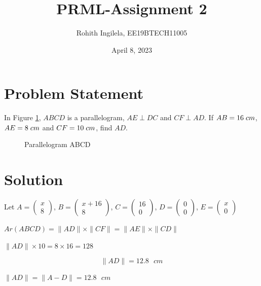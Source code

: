 \documentclass[letterpaper,12pt]{article}
\title{PRML-Assignment 2}
\author{Rohith Ingilela,  EE19BTECH11005 }
\date{April 8, 2023}
\begin{document}
\maketitle

\section{Problem Statement}

In Figure \ref{fig:fig1}, $ABCD$ is a parallelogram, $AE \perp DC$
and $CF \perp AD$. If $AB = 16 \hspace{0.1cm} cm$, $AE = 8 \hspace{0.1cm} cm$ and
$CF = 10 \hspace{0.1cm} cm$, find $AD$.

\begin{figure}[!ht]
\centering


\caption{Parallelogram ABCD}
\label{fig:fig1}
\end{figure}
\section{Solution}
Let $A = \begin{pmatrix} x \\ 8 \end{pmatrix}$, $B = \begin{pmatrix} x + 16 \\ 8 \end{pmatrix}$, $C = \begin{pmatrix} 16 \\ 0 \end{pmatrix}$, $D = \begin{pmatrix} 0 \\ 0 \end{pmatrix}$, $E = \begin{pmatrix} x \\ 0 \end{pmatrix}$

\begin{center}
    $Ar(ABCD) = \|AD\|\times\|CF\| = \|AE\|\times\|CD\|$ \\
\end{center}
\begin{center}
    $\|AD\| \times 10 = 8 \times 16 = 128$
\end{center}
\begin{equation}
    \|AD\| = 12.8 \text{ } cm
\end{equation}
\begin{center}
    $\|AD\| = \|A - D\| = 12.8 \text{ } cm$
\end{center}
\end{document}
